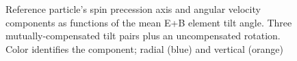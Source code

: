 \begin{figure}[!h]
	\centering
	\caption{Reference particle's spin precession axis and angular velocity components as
		functions of the mean E+B element tilt angle. Three mutually-compensated tilt pairs plus an uncompensated
		rotation.
		Color identifies the component; radial (blue) and vertical (orange)\label{fig:Linearity_test_compensated}}
\end{figure}

